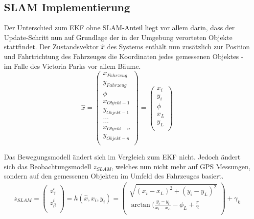 \documentclass[11pt]{article}
\begin{document}
\subsection{SLAM Implementierung}
Der Unterschied zum EKF ohne SLAM-Anteil liegt vor allem darin, dass der Update-Schritt nun auf Grundlage der in der Umgebung verorteten Objekte stattfindet. Der Zustandsvektor $\hat{x}$ des Systems enthält nun zusätzlich zur Position und Fahrtrichtung des Fahrzeuges die Koordinaten jedes gemessenen Objektes - im Falle des Victoria Parks vor allem Bäume. 
\begin{equation}\label{SLAM-State-Vector}
	\hat{x} = \begin{pmatrix}
		x_{Fahrzeug} \\
		y_{Fahrzeug} \\
		\phi \\
		x_{Objekt-1} \\
		y_{Objekt-1} \\
		... \\
		... \\
		x_{Objekt-n} \\
		y_{Objekt-n} \\
	  \end{pmatrix} = \begin{pmatrix}
		  x_i \\
		  y_i \\
		  \phi \\
		  x_L \\
		  y_L \\
	  \end{pmatrix}
\end{equation}

Das Bewegungsmodell ändert sich im Vergleich zum EKF nicht. Jedoch ändert sich das Beobachtungsmodell $z_{SLAM}$, welches nun nicht mehr auf GPS Messungen, sondern auf den gemessenen Objekten im Umfeld des Fahrzeuges basiert.
\begin{equation}\label{SLAM-Observation-Model}
\begin{split}
	z_{SLAM} = \begin{pmatrix}
		z_\gamma^i \\
		z_\beta^i \\
	\end{pmatrix} = h(\hat{x}, x_i, y_i)
	= \begin{pmatrix}
		\sqrt{(x_i-x_L)^2 + (y_i-y_L)^2} \\
		\arctan(\frac{y_i-y_l}{x_i-x_L} - \phi_L +\frac{\pi}{2} \\
	\end{pmatrix} + \gamma_k
\end{split}
\end{equation}
\end{document}
